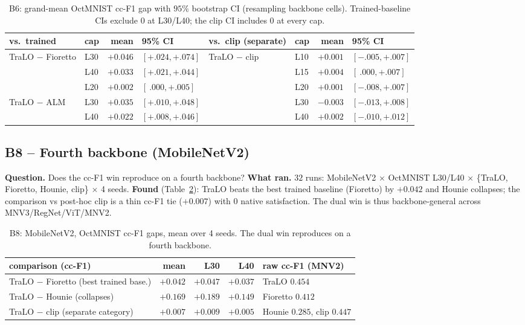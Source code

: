\documentclass[11pt,a4paper]{article}
\begin{document}
\begin{table}[h]\centering\small
\begin{tabular}{llrl@{\hskip 1.4cm}llrl}
\toprule
vs.\ trained & cap & mean & 95\% CI & vs.\ clip (separate) & cap & mean & 95\% CI \\
\midrule
TraLO $-$ Fioretto & L30 & $+0.046$ & $[+.024,+.074]$ & TraLO $-$ clip & L10 & $+0.001$ & $[-.005,+.007]$ \\
                   & L40 & $+0.033$ & $[+.021,+.044]$ &                & L15 & $+0.004$ & $[\ .000,+.007]$ \\
                   & L20 & $+0.002$ & $[\ .000,+.005]$ &                & L20 & $+0.001$ & $[-.008,+.007]$ \\
TraLO $-$ ALM      & L30 & $+0.035$ & $[+.010,+.048]$ &                & L30 & $-0.003$ & $[-.013,+.008]$ \\
                   & L40 & $+0.022$ & $[+.008,+.046]$ &                & L40 & $+0.002$ & $[-.010,+.012]$ \\
\bottomrule
\end{tabular}
\caption{B6: grand-mean OctMNIST cc-F1 gap with $95\%$ bootstrap CI (resampling backbone cells). Trained-baseline
CIs exclude $0$ at L30/L40; the clip CI includes $0$ at every cap.}
\label{tab:b6}
\end{table}

\subsection{B8 -- Fourth backbone (MobileNetV2)}
\textbf{Question.} Does the cc-F1 win reproduce on a fourth backbone? \textbf{What ran.} $32$ runs: MobileNetV2
$\times$ OctMNIST L30/L40 $\times$ \{TraLO, Fioretto, Hounie, clip\} $\times$ 4 seeds. \textbf{Found}
(Table~\ref{tab:b8}): TraLO beats the best trained baseline (Fioretto) by $+0.042$ and Hounie collapses; the
comparison vs post-hoc clip is a thin cc-F1 tie ($+0.007$) with $0$ native satisfaction. The dual win is thus
backbone-general across MNV3/RegNet/ViT/MNV2.

\begin{table}[h]\centering\small
\begin{tabular}{lrrr@{\hskip 1.4cm}l}
\toprule
comparison (cc-F1) & mean & L30 & L40 & raw cc-F1 (MNV2) \\
\midrule
TraLO $-$ Fioretto (best trained base.) & $+0.042$ & $+0.047$ & $+0.037$ & TraLO $0.454$ \\
TraLO $-$ Hounie (collapses) & $+0.169$ & $+0.189$ & $+0.149$ & Fioretto $0.412$ \\
TraLO $-$ clip (separate category) & $+0.007$ & $+0.009$ & $+0.005$ & Hounie $0.285$, clip $0.447$ \\
\bottomrule
\end{tabular}
\caption{B8: MobileNetV2, OctMNIST cc-F1 gaps, mean over 4 seeds. The dual win reproduces on a fourth backbone.}
\label{tab:b8}
\end{table}
\end{document}
